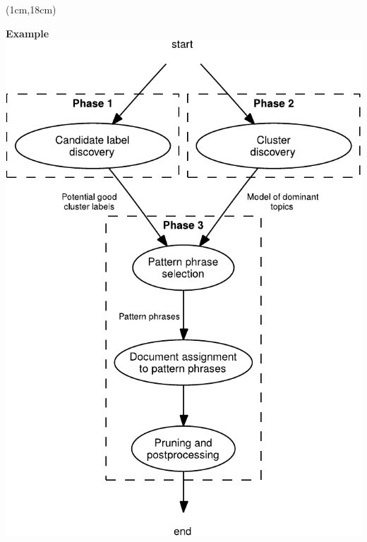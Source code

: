 \documentclass[oneside,final]{beamer}
\begin{document}
\begin{textblock*}{8cm}(1cm,18cm)\noindent%
\begin{beamerboxesrounded}[shadow=false,upper=block1up,lower=example1down]{\large\textbf{Example}}
\centering \includegraphics[width=.7\linewidth]{dcf-phases} \par
\end{beamerboxesrounded}
\end{textblock*}
\end{document}
